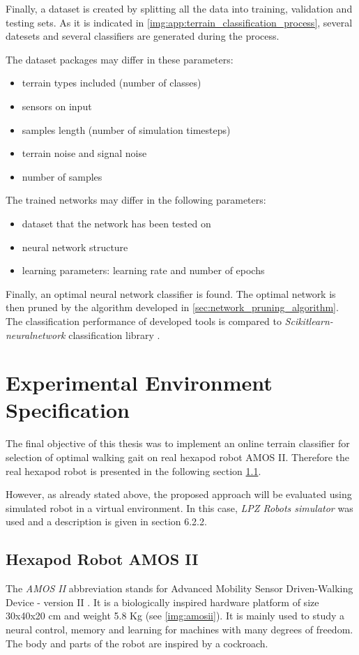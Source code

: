 Finally, a dataset is created by splitting all the data into training, validation and testing sets. As it is indicated in \cref{img:app:terrain_classification_process}, several datesets and several classifiers are generated during the process. 

The dataset packages may differ in these parameters:
\begin{itemize}
\item terrain types included (number of classes)
\item sensors on input
\item samples length (number of simulation timesteps)
\item terrain noise and signal noise
\item number of samples
\end{itemize}

The trained networks may differ in the following parameters:
\begin{itemize}
\item dataset that the network has been tested on
\item neural network structure
\item learning parameters: learning rate and number of epochs
\end{itemize}

Finally, an optimal neural network classifier is found. The optimal network is then pruned by the algorithm developed in \cref{sec:network_pruning_algorithm}. The classification performance of developed tools is compared to \textit{Scikitlearn-neuralnetwork} classification library \citep{misc:sknn}.

\section{Experimental Environment Specification}
The final objective of this thesis was to implement an online terrain classifier for selection of optimal walking gait on real hexapod robot AMOS II. Therefore the real hexapod robot is presented in the following section \ref{ssec:amosii}.

However, as already stated above, the proposed approach will be evaluated using simulated robot in a virtual environment. In this case, \textit{LPZ Robots simulator} \citep{misc:lpzrobots} was used and a description is given in section 6.2.2.

\subsection{Hexapod Robot AMOS II} \label{ssec:amosii}
The \textit{AMOS II} abbreviation stands for Advanced Mobility Sensor Driven-Walking Device - version II \citep{misc:amosii}. It is a biologically inspired hardware platform of size 30x40x20 cm and weight 5.8 Kg (see \cref{img:amosii}). It is mainly used to study a neural control, memory and learning for machines with many degrees of freedom. The body and parts of the robot are inspired by a cockroach.

